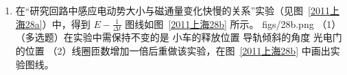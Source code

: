 \documentclass[\gkver]{gaokaozhenti}
\begin{document}
\begin{enumerate}
{（2）一滴溶液含油酸的体积 $V = 4.8 \times 10^{-3}\UmL \times 0.10\% = 4.8 \times 10^{-6}\UmL$，由 $V = Sd$ 可得，油酸的直径 $d = \frac{V}{S} = 1.2 \times 10^{-9}\Um$。
}

\item
在“研究回路中感应电动势大小与磁通量变化快慢的关系”实验（见图~\ref{2011上海28a}）中，得到 $E - \frac{1}{\Delta t}$ 图线如图~\ref{2011上海28b} 所示。
{figs/28b.png}
（1）（多选题）在实验中需保持不变的是
{小车的释放位置}
{导轨倾斜的角度}
{光电门的位置}
（2）线圈匝数增加一倍后重做该实验，在图~\ref{2011上海28b} 中画出实验图线。


\end{enumerate}
\end{document}
